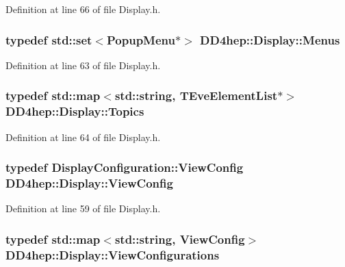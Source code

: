 Definition at line 66 of file Display.h.\hypertarget{class_d_d4hep_1_1_display_a4dbc259bd581b56802ef3c29b72909be}{
\subsubsection[{Menus}]{\setlength{\rightskip}{0pt plus 5cm}typedef std::set$<${\bf PopupMenu}$\ast$$>$ {\bf DD4hep::Display::Menus}}}
\label{class_d_d4hep_1_1_display_a4dbc259bd581b56802ef3c29b72909be}


Definition at line 63 of file Display.h.\hypertarget{class_d_d4hep_1_1_display_ab7cf442eb2211f57f55b7cd1cf8a61c1}{
\subsubsection[{Topics}]{\setlength{\rightskip}{0pt plus 5cm}typedef std::map$<$std::string, {\bf TEveElementList}$\ast$$>$ {\bf DD4hep::Display::Topics}}}
\label{class_d_d4hep_1_1_display_ab7cf442eb2211f57f55b7cd1cf8a61c1}


Definition at line 64 of file Display.h.\hypertarget{class_d_d4hep_1_1_display_a7be76e4de32d9d1084a6ca2f52669f68}{
\subsubsection[{ViewConfig}]{\setlength{\rightskip}{0pt plus 5cm}typedef {\bf DisplayConfiguration::ViewConfig} {\bf DD4hep::Display::ViewConfig}}}
\label{class_d_d4hep_1_1_display_a7be76e4de32d9d1084a6ca2f52669f68}


Definition at line 59 of file Display.h.\hypertarget{class_d_d4hep_1_1_display_a1bb7fbc1eeb22ef2b1cea35c78e9d27a}{
\subsubsection[{ViewConfigurations}]{\setlength{\rightskip}{0pt plus 5cm}typedef std::map$<$std::string, {\bf ViewConfig}$>$ {\bf DD4hep::Display::ViewConfigurations}}}
\label{class_d_d4hep_1_1_display_a1bb7fbc1eeb22ef2b1cea35c78e9d27a}


